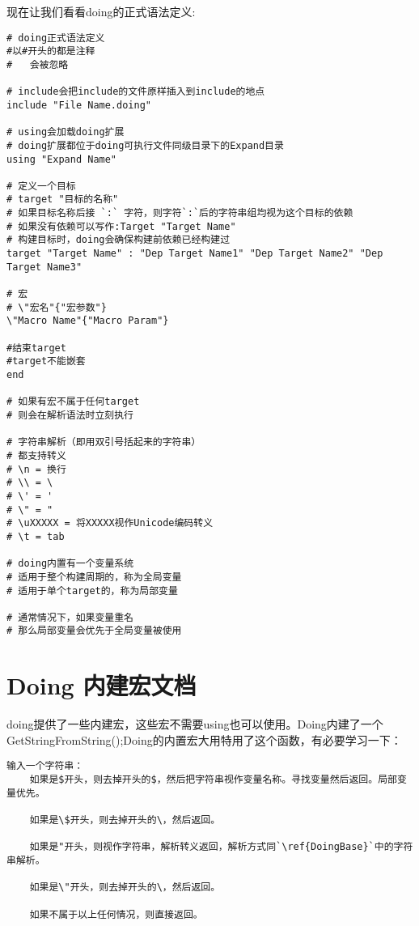 现在让我们看看doing的正式语法定义:
\label{DoingBase}
\begin{lstlisting}
# doing正式语法定义
#以#开头的都是注释
#	会被忽略

# include会把include的文件原样插入到include的地点
include "File Name.doing"

# using会加载doing扩展
# doing扩展都位于doing可执行文件同级目录下的Expand目录
using "Expand Name"

# 定义一个目标
# target "目标的名称"
# 如果目标名称后接 `:` 字符，则字符`:`后的字符串组均视为这个目标的依赖
# 如果没有依赖可以写作:Target "Target Name"
# 构建目标时，doing会确保构建前依赖已经构建过
target "Target Name" : "Dep Target Name1" "Dep Target Name2" "Dep Target Name3"

# 宏
# \"宏名"{"宏参数"}
\"Macro Name"{"Macro Param"}

#结束target
#target不能嵌套
end

# 如果有宏不属于任何target
# 则会在解析语法时立刻执行

# 字符串解析（即用双引号括起来的字符串） 
# 都支持转义
# \n = 换行
# \\ = \
# \' = '
# \" = "
# \uXXXXX = 将XXXXX视作Unicode编码转义
# \t = tab

# doing内置有一个变量系统
# 适用于整个构建周期的，称为全局变量
# 适用于单个target的，称为局部变量

# 通常情况下，如果变量重名
# 那么局部变量会优先于全局变量被使用
\end{lstlisting}


\chapter{Doing 内建宏文档}
doing提供了一些内建宏，这些宏不需要using也可以使用。Doing内建了一个GetStringFromString();Doing的内置宏大用特用了这个函数，有必要学习一下：\newline{}
\label{GetStringFromStrin}
\begin{lstlisting}
输入一个字符串：
	如果是$开头，则去掉开头的$，然后把字符串视作变量名称。寻找变量然后返回。局部变量优先。
	
	如果是\$开头，则去掉开头的\，然后返回。
	
	如果是"开头，则视作字符串，解析转义返回，解析方式同`\ref{DoingBase}`中的字符串解析。
	
	如果是\"开头，则去掉开头的\，然后返回。
	
	如果不属于以上任何情况，则直接返回。
\end{lstlisting}



